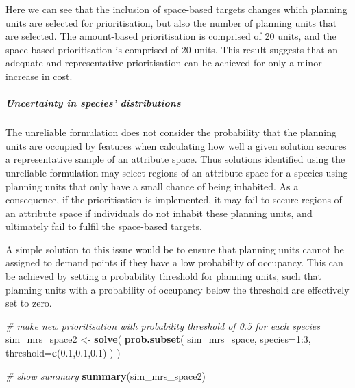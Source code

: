 \documentclass[11pt,]{article}
\newenvironment{Shaded}{\begin{snugshade}}{\end{snugshade}}
\newcommand{\KeywordTok}[1]{\textcolor[rgb]{0.13,0.29,0.53}{\textbf{{#1}}}}
\newcommand{\DataTypeTok}[1]{\textcolor[rgb]{0.13,0.29,0.53}{{#1}}}
\newcommand{\DecValTok}[1]{\textcolor[rgb]{0.00,0.00,0.81}{{#1}}}
\newcommand{\FloatTok}[1]{\textcolor[rgb]{0.00,0.00,0.81}{{#1}}}
\newcommand{\StringTok}[1]{\textcolor[rgb]{0.31,0.60,0.02}{{#1}}}
\newcommand{\CommentTok}[1]{\textcolor[rgb]{0.56,0.35,0.01}{\textit{{#1}}}}
\newcommand{\NormalTok}[1]{{#1}}
\begin{document}
Here we can see that the inclusion of space-based targets changes which
planning units are selected for prioritisation, but also the number of
planning units that are selected. The amount-based prioritisation is
comprised of 20 units, and the space-based prioritisation is comprised
of 20 units. This result suggests that an adequate and representative
prioritisation can be achieved for only a minor increase in cost.

\subparagraph{Uncertainty in species'
distributions}\label{uncertainty-in-species-distributions}

The unreliable formulation does not consider the probability that the
planning units are occupied by features when calculating how well a
given solution secures a representative sample of an attribute space.
Thus solutions identified using the unreliable formulation may select
regions of an attribute space for a species using planning units that
only have a small chance of being inhabited. As a consequence, if the
prioritisation is implemented, it may fail to secure regions of an
attribute space if individuals do not inhabit these planning units, and
ultimately fail to fulfil the space-based targets.

A simple solution to this issue would be to ensure that planning units
cannot be assigned to demand points if they have a low probability of
occupancy. This can be achieved by setting a probability threshold for
planning units, such that planning units with a probability of occupancy
below the threshold are effectively set to zero.

\begin{Shaded}
\begin{Highlighting}[]
\CommentTok{# make new prioritisation with probability threshold of 0.5 for each species}
\NormalTok{sim_mrs_space2 <-}\StringTok{ }\KeywordTok{solve}\NormalTok{(}
    \KeywordTok{prob.subset}\NormalTok{(}
        \NormalTok{sim_mrs_space,}
        \DataTypeTok{species=}\DecValTok{1}\NormalTok{:}\DecValTok{3}\NormalTok{,}
        \DataTypeTok{threshold=}\KeywordTok{c}\NormalTok{(}\FloatTok{0.1}\NormalTok{,}\FloatTok{0.1}\NormalTok{,}\FloatTok{0.1}\NormalTok{)}
    \NormalTok{)}
\NormalTok{)}
\end{Highlighting}
\end{Shaded}

\begin{Shaded}
\begin{Highlighting}[]
\CommentTok{# show summary}
\KeywordTok{summary}\NormalTok{(sim_mrs_space2)}
\end{Highlighting}
\end{Shaded}
\end{document}
